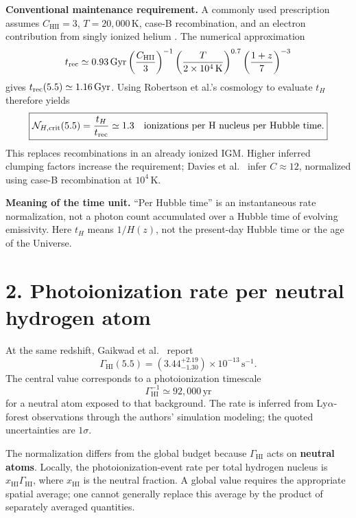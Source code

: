 \documentclass[11pt,a4paper]{article}
\newcommand{\Gyr}{\mathrm{Gyr}}
\newcommand{\HI}{\mathrm{HI}}
\newcommand{\HII}{\mathrm{HII}}
\begin{document}
\textbf{Conventional maintenance requirement.}
A commonly used prescription assumes $C_{\HII}=3$,
$T=20{,}000\,\mathrm K$, case-B recombination, and an electron contribution
from singly ionized helium \cite{Robertson2015}. The numerical approximation
\cite[Eq.\ (3)]{Lovell2018}
\begin{equation}
 t_{\rm rec}\simeq0.93\,\Gyr
 \left(\frac{C_{\HII}}{3}\right)^{-1}
 \left(\frac{T}{2\times10^4\,\mathrm K}\right)^{0.7}
 \left(\frac{1+z}{7}\right)^{-3}
\end{equation}
gives $t_{\rm rec}(5.5)\simeq1.16\,\Gyr$. Using Robertson et al.'s
cosmology to evaluate $t_H$ therefore yields
\begin{equation}
 \boxed{\mathcal N_{H,\rm crit}(5.5)=\frac{t_H}{t_{\rm rec}}
 \simeq1.3
 \quad\text{ionizations per H nucleus per Hubble time}.}
\end{equation}
This replaces recombinations in an already ionized IGM. Higher inferred
clumping factors increase the requirement; Davies et al.\ \cite{Davies2024}
infer $C\approx12$, normalized using case-B recombination at $10^4\,\mathrm K$.

\textbf{Meaning of the time unit.} ``Per Hubble time'' is an instantaneous
rate normalization, not a photon count accumulated over a Hubble time of
evolving emissivity. Here $t_H$ means $1/H(z)$, not the present-day Hubble
time or the age of the Universe.

\newpage
\section*{2. Photoionization rate per neutral hydrogen atom}
At the same redshift, Gaikwad et al.\ \cite[Table 3]{Gaikwad2023} report
\begin{equation}
 \boxed{\Gamma_{\HI}(5.5)=
 \left(3.44^{+2.19}_{-1.30}\right)\times10^{-13}
 \,\mathrm{s}^{-1}.}
\end{equation}
The central value corresponds to a photoionization timescale
\begin{equation}
 \Gamma_{\HI}^{-1}\simeq92{,}000\,\mathrm{yr}
\end{equation}
for a neutral atom exposed to that background. The rate is inferred from
Ly$\alpha$-forest observations through the authors' simulation modeling;
the quoted uncertainties are $1\sigma$.

The normalization differs from the global budget because $\Gamma_{\HI}$
acts on \textbf{neutral atoms}. Locally, the photoionization-event rate per
total hydrogen nucleus is $x_{\HI}\Gamma_{\HI}$, where $x_{\HI}$ is the
neutral fraction. A global value requires the appropriate spatial average;
one cannot generally replace this average by the product of separately
averaged quantities.
\end{document}
